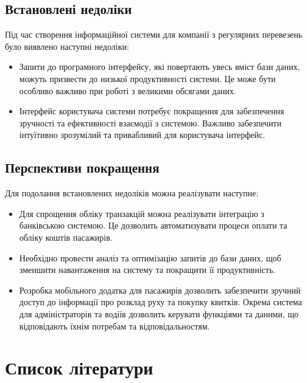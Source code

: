 \documentclass[oneside,14pt]{extarticle}
\begin{document}
\subsection{Встановлені недоліки}
Під час створення інформаційної системи для компанії з регулярних перевезень було виявлено наступні недоліки:
\begin{itemize}
\item Запити до програмного інтерфейсу, які повертають увесь вміст бази даних, можуть призвести до низької продуктивності системи. Це може бути особливо важливо при роботі з великими обсягами даних.
\item Інтерфейс користувача системи потребує покращення для забезпечення зручності та ефективності взаємодії з системою. Важливо забезпечити інтуїтивно зрозумілий та привабливий для користувача інтерфейс.
\end{itemize}

\subsection{Перспективи покращення}
Для подолання встановлених недоліків можна реалізувати наступне:
\begin{itemize}
\item Для спрощення обліку транзакцій можна реалізувати інтеграцію з банківською системою. Це дозволить автоматизувати процеси оплати та обліку коштів пасажирів.
\item Необхідно провести аналіз та оптимізацію запитів до бази даних, щоб зменшити навантаження на систему та покращити її продуктивність.
\item Розробка мобільного додатка для пасажирів дозволить забезпечити зручний доступ до інформації про розклад руху та покупку квитків. Окрема система для адміністраторів та водіїв дозволить керувати функціями та даними, що відповідають їхнім потребам та відповідальностям.
\end{itemize}

\newpage

\section*{Список літератури}
\setcounter{subsection}{0}
\end{document}
